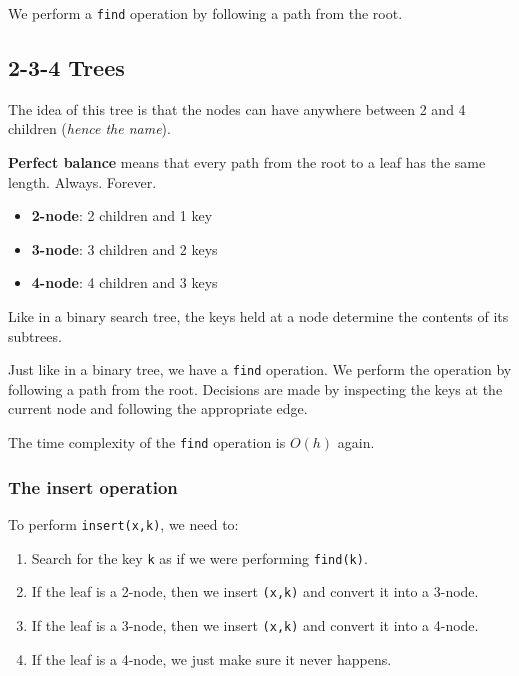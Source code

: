 \documentclass[11pt,a4paper,titlepage,dvipsnames,cmyk]{scrartcl}
\begin{document}
We perform a \lstinline|find| operation by following a path from the root.


\subsection{2-3-4 Trees}%
\label{sub:2-3-4 Trees}
The idea of this tree is that the nodes can have anywhere between 2 and 4
children (\textit{hence the name}).

\textbf{Perfect balance} means that every path from the root to a leaf has
the same length. Always. Forever.

\begin{itemize}
    \item \textbf{2-node}: 2 children and 1 key
    \item \textbf{3-node}: 3 children and 2 keys
    \item \textbf{4-node}: 4 children and 3 keys
\end{itemize}

Like in a binary search tree, the keys held at a node determine the
contents of its subtrees.

Just like in a binary tree, we have a \lstinline|find| operation. We
perform the operation by following a path from the root. Decisions are
made by inspecting the keys at the current node and following the
appropriate edge.

The time complexity of the \lstinline|find| operation is $O(h)$ again.

\subsubsection{The insert operation}%
\label{ssub:insert}
To perform \lstinline|insert(x,k)|, we need to:
\begin{enumerate}
    \item Search for the key \lstinline|k|  as if we were performing
        \lstinline|find(k)|.
    \item If the leaf is a 2-node, then we insert \lstinline|(x,k)| and
        convert it into a 3-node.
    \item If the leaf is a 3-node, then we insert \lstinline|(x,k)| and
        convert it into a 4-node.
    \item If the leaf is a 4-node, we just make sure it never happens.
\end{enumerate}
\end{document}
